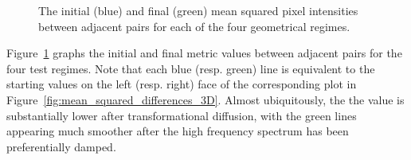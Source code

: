 \begin{figure}
    \caption{The initial (blue) and final (green) mean squared pixel intensities between adjacent pairs for each of the four geometrical regimes.}
    \label{fig:mean_squared_differences_2D}
  \end{figure}

  Figure~\ref{fig:mean_squared_differences_2D} graphs the initial and final metric values between adjacent pairs for the four test regimes. Note that each blue (resp. green) line is equivalent to the starting values on the left (resp. right) face of the corresponding plot in Figure~\ref{fig:mean_squared_differences_3D}. Almost ubiquitously, the the value is substantially lower after transformational diffusion, with the green lines appearing much smoother after the high frequency spectrum has been preferentially damped.
  
